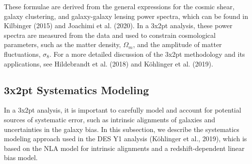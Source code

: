 \documentclass[twocolumn,draft]{aastex631}
\begin{document}
These formulae are derived from the general expressions for the cosmic shear, galaxy clustering, and galaxy-galaxy lensing power spectra, which can be found in Kilbinger (2015) and Joachimi et al. (2020). In a 3x2pt analysis, these power spectra are measured from the data and used to constrain cosmological parameters, such as the matter density, $\Omega_m$, and the amplitude of matter fluctuations, $\sigma_8$. For a more detailed discussion of the 3x2pt methodology and its applications, see Hildebrandt et al. (2018) and Köhlinger et al. (2019).

%
%

\subsection{3x2pt Systematics Modeling}

In a 3x2pt analysis, it is important to carefully model and account for potential sources of systematic error, such as intrinsic alignments of galaxies and uncertainties in the galaxy bias. In this subsection, we describe the systematics modeling approach used in the DES Y1 analysis (Köhlinger et al., 2019), which is based on the NLA model for intrinsic alignments and a redshift-dependent linear bias model.
\end{document}
